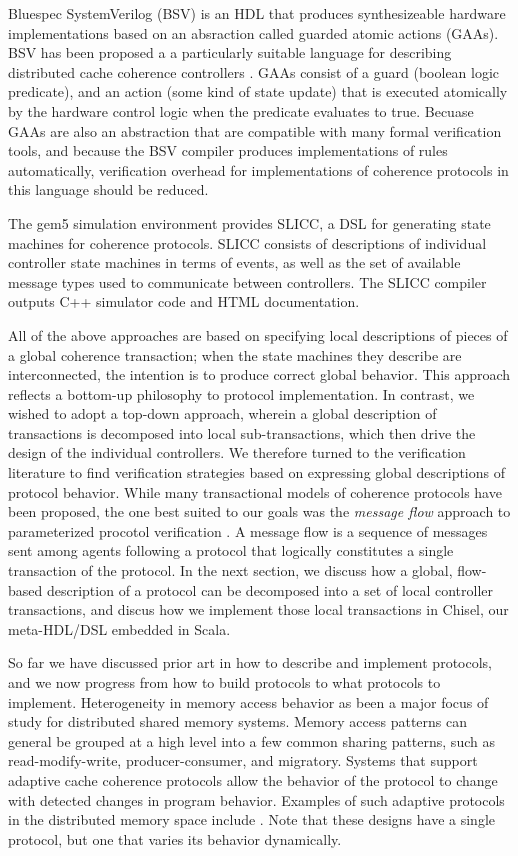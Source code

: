 Bluespec SystemVerilog (BSV) \cite{bluespec}
is an HDL that produces synthesizeable hardware implementations based on an absraction called guarded atomic actions (GAAs).
BSV has been proposed a a particularly suitable language for describing distributed cache coherence controllers \cite{dave-memocode05}.
GAAs consist of a guard (boolean logic predicate), and an action (some kind of state update)
that is executed atomically by the hardware control logic when the predicate evaluates to true.
Becuase GAAs are also an abstraction that are compatible with many formal verification tools,
and because the BSV compiler produces implementations of rules automatically,
verification overhead for implementations of coherence protocols in this language should be reduced.

The gem5 simulation environment \cite{binkert-sigarch11}
provides SLICC, a DSL for generating state machines for coherence protocols.
SLICC consists of descriptions of individual controller state machines in terms of events, as well as the set of available message types
used to communicate between controllers.
The SLICC compiler outputs C++ simulator code and HTML documentation.

All of the above approaches are based on specifying local descriptions of pieces of a global coherence transaction;
when the state machines they describe are interconnected, the intention is to produce correct global behavior.
This approach reflects a bottom-up philosophy to protocol implementation.
In contrast, we wished to adopt a top-down approach, wherein a global description of transactions
is decomposed into local sub-transactions, which then drive the design of the individual controllers.
We therefore turned to the verification literature to find verification strategies based on expressing global descriptions of protocol behavior.
While many transactional models of coherence protocols have been proposed,
the one best suited to our goals was the \emph{message flow} approach to parameterized procotol verification
\cite{talupur2008going, oleary-fmcad09}.
A message flow is a sequence of messages sent among agents following a protocol that
logically constitutes a single transaction of the protocol. 
In the next section, we discuss how a global, flow-based description of a protocol can be decomposed into a set
of local controller transactions, and discus how we implement those local transactions in Chisel,
our meta-HDL/DSL embedded in Scala.

So far we have discussed prior art in how to describe and implement protocols,
and we now progress from how to build protocols to what protocols to implement. 
Heterogeneity in memory access behavior as been a major focus of study for distributed shared memory systems.
Memory access patterns can general be grouped at a high level into a few common sharing patterns, such as read-modify-write, producer-consumer, and migratory. Systems that support adaptive cache coherence protocols allow the behavior of the protocol to change with detected changes in program behavior.  Examples of such adaptive protocols in the distributed memory space include \cite{amza-hpca97,lebeck-archnews95,stenstrom-isca93,cox-isca93}. Note that these designs have a single protocol, but one that varies its behavior dynamically.

